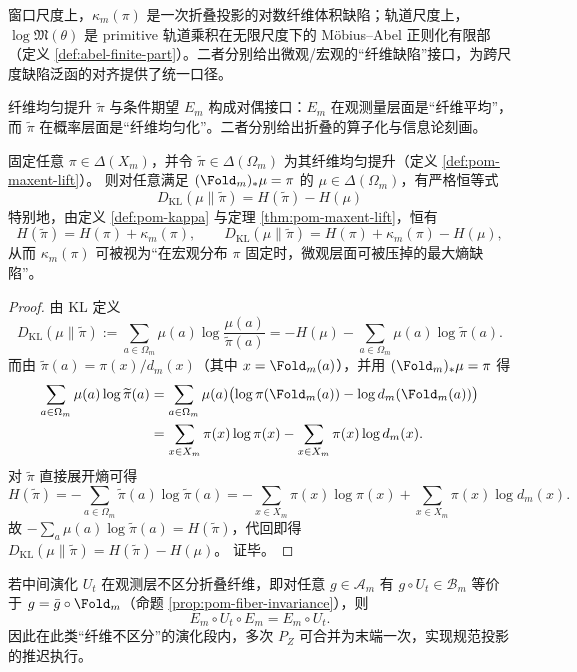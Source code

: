 \begin{remark}[窗口缺陷与有限部常数的同型]\label{rem:pom-kappa-logm}
窗口尺度上，$\kappa_m(\pi)$ 是一次折叠投影的对数纤维体积缺陷；轨道尺度上，$\log\mathfrak{M}(\theta)$ 是 primitive 轨道乘积在无限尺度下的 Möbius--Abel 正则化有限部（定义 \ref{def:abel-finite-part}）。二者分别给出微观/宏观的“纤维缺陷”接口，为跨尺度缺陷泛函的对齐提供了统一口径。
\end{remark}

\begin{remark}[与条件期望的对偶性]
纤维均匀提升 $\widetilde\pi$ 与条件期望 $E_m$ 构成对偶接口：$E_m$ 在观测量层面是“纤维平均”，而 $\widetilde\pi$ 在概率层面是“纤维均匀化”。二者分别给出折叠的算子化与信息论刻画。
\end{remark}

\begin{proposition}\label{prop:pom-kl-defect-identity}
固定任意 \(\pi\in\Delta(X_m)\)，并令 \(\widetilde\pi\in\Delta(\Omega_m)\) 为其纤维均匀提升（定义 \ref{def:pom-maxent-lift}）。
则对任意满足 \((\Fold_m)_*\mu=\pi\) 的 \(\mu\in\Delta(\Omega_m)\)，有严格恒等式
\[
\boxed{\;
D_{\mathrm{KL}}(\mu\|\widetilde\pi)=H(\widetilde\pi)-H(\mu)\;}
\]
特别地，由定义 \ref{def:pom-kappa} 与定理 \ref{thm:pom-maxent-lift}，恒有
\[
H(\widetilde\pi)=H(\pi)+\kappa_m(\pi),
\qquad
D_{\mathrm{KL}}(\mu\|\widetilde\pi)=H(\pi)+\kappa_m(\pi)-H(\mu),
\]
从而 \(\kappa_m(\pi)\) 可被视为“在宏观分布 \(\pi\) 固定时，微观层面可被压掉的最大熵缺陷”。
\end{proposition}

\begin{proof}
由 KL 定义
\[
D_{\mathrm{KL}}(\mu\|\widetilde\pi):=\sum_{a\in\Omega_m}\mu(a)\log\frac{\mu(a)}{\widetilde\pi(a)}
=-H(\mu)-\sum_{a\in\Omega_m}\mu(a)\log\widetilde\pi(a).
\]
而由 \(\widetilde\pi(a)=\pi(x)/d_m(x)\)（其中 \(x=\Fold_m(a)\)），并用 \((\Fold_m)_*\mu=\pi\) 得
\[
\begin{aligned}
\sum_{a\in\Omega_m}\mu(a)\log\widetilde\pi(a)
&=\sum_{a\in\Omega_m}\mu(a)\bigl(\log\pi(\Fold_m(a))-\log d_m(\Fold_m(a))\bigr)\\
&=\sum_{x\in X_m}\pi(x)\log\pi(x)-\sum_{x\in X_m}\pi(x)\log d_m(x).
\end{aligned}
\]
对 \(\widetilde\pi\) 直接展开熵可得
\[
H(\widetilde\pi)
=-\sum_{a\in\Omega_m}\widetilde\pi(a)\log\widetilde\pi(a)
=-\sum_{x\in X_m}\pi(x)\log\pi(x)+\sum_{x\in X_m}\pi(x)\log d_m(x).
\]
故 \(-\sum_a\mu(a)\log\widetilde\pi(a)=H(\widetilde\pi)\)，代回即得
\(
D_{\mathrm{KL}}(\mu\|\widetilde\pi)=H(\widetilde\pi)-H(\mu)
\)。
证毕。
\end{proof}

\begin{remark}[延迟归一化推迟律]\label{rem:pom-lazy-fold}
若中间演化 $U_t$ 在观测层不区分折叠纤维，即对任意 $g\in\mathcal{A}_m$ 有 $g\circ U_t\in\mathcal{B}_m$ 等价于 $g=\bar g\circ\Fold_m$（命题 \ref{prop:pom-fiber-invariance}），则
\[
E_m\circ U_t\circ E_m=E_m\circ U_t.
\]
因此在此类“纤维不区分”的演化段内，多次 $P_Z$ 可合并为末端一次，实现规范投影的推迟执行。
\end{remark}
